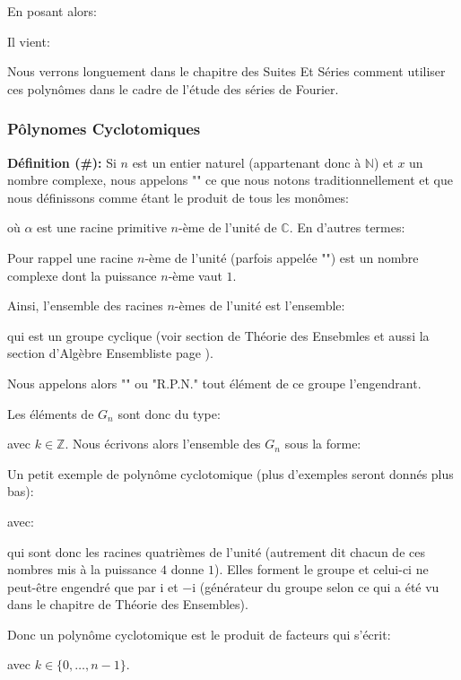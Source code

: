 	En posant alors:
	
	Il vient:
	
	Nous verrons longuement dans le chapitre des Suites Et Séries comment utiliser ces polynômes dans le cadre de l'étude des séries de Fourier.
	
	\subsubsection{Pôlynomes Cyclotomiques}
	\textbf{Définition (\#\mydef):} Si $n$ est un entier naturel (appartenant donc à $\mathbb{N}$) et $x$ un nombre complexe, nous appelons "" ce que nous notons traditionnellement et que nous définissons comme étant le produit de tous les monômes:
	
	où $\alpha$ est une racine primitive $n$-ème de l'unité de $\mathbb{C}$. En d'autres termes:
	
	Pour rappel une racine $n$-ème de l'unité (parfois appelée "") est un nombre complexe dont la puissance $n$-ème vaut $1$.
	
	Ainsi, l'ensemble des racines $n$-èmes de l'unité est l'ensemble:
	
	qui est un groupe cyclique (voir  section de Théorie des Ensebmles et aussi la section d'Algèbre Ensembliste page \pageref{set algebra}).
	
	Nous appelons alors "" ou "R.P.N." tout élément de ce groupe l'engendrant.
	
	Les éléments de $G_n$ sont donc du type:
	
	avec $k\in \mathbb{Z}$. Nous écrivons alors l'ensemble des $G_n$ sous la forme:
	
	Un petit exemple de polynôme cyclotomique (plus d'exemples seront donnés plus bas):
	
	avec:
	
	qui sont donc les racines quatrièmes de l'unité (autrement dit chacun de ces nombres mis à la puissance $4$ donne $1$). Elles forment le groupe et celui-ci ne peut-être engendré que par $\mathrm{i}$ et $-\mathrm{i}$ (générateur du groupe selon ce qui a été vu dans le chapitre de Théorie des Ensembles).
	
	Donc un polynôme cyclotomique est le produit de facteurs qui s'écrit:
	
	avec $k\in \{0,\ldots,n-1\}$.
	
